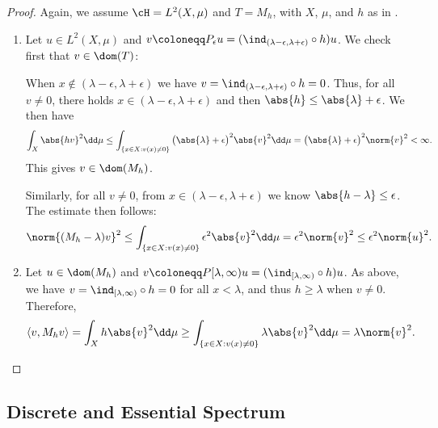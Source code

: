 \documentclass[oneside,reqno,letterpaper]{amsart}
\begin{document}
\begin{proof}
  Again, we assume \(\cH = L^2(X, \mu)\) and \(T = M_{h}\), with  \(X\), \(\mu\), and \(h\) as in . 
  \begin{enumerate}[label=(\alph*)]
  \item 
    Let \(u \in L^2(X, \mu)\) and \(v \coloneqq P_{\epsilon} u = (\ind_{(\lambda - \epsilon, \lambda + \epsilon)} \circ h) u\). 
    We check first that \(v \in \dom(T)\): 

    When \(x \not\in (\lambda - \epsilon, \lambda + \epsilon)\) we have \(v = \ind_{(\lambda - \epsilon, \lambda + \epsilon)} \circ h = 0\). 
    Thus, for all \(v \neq 0\), there holds \(x \in (\lambda - \epsilon, \lambda + \epsilon)\) and then \(\abs{h} \leq \abs{\lambda} + \epsilon\). 
    We then have 
    \[
      \int_{X} \abs{h v}^2 \dd\mu
      \leq \int_{\{x \in X: v(x) \neq 0\}} \big(\abs{\lambda} + \epsilon\big)^2 \abs{v}^2 \dd\mu 
      = \big(\abs{\lambda} + \epsilon\big)^2 \norm{v}^2 < \infty . 
    \] 
    This gives \(v \in \dom(M_{h})\). 

    Similarly, for all \(v \neq 0\), from \(x \in (\lambda - \epsilon, \lambda + \epsilon)\) we know \(\abs{h - \lambda} \leq \epsilon\).
    The estimate then follows:
    \[
      \norm{(M_{h} - \lambda) v}^2
      \leq \int_{\{x \in X: v(x) \neq 0\}} \epsilon^2 \abs{v}^2 \dd\mu  
      = \epsilon^2 \norm{v}^2  
      \leq \epsilon^2 \norm{u}^2 . 
    \] 
    
  \item 
    Let \(u \in \dom(M_{h})\) and \(v \coloneqq P[\lambda, \infty)u = (\ind_{[\lambda, \infty)} \circ h) u\). 
    As above, we have \(v = \ind_{[\lambda, \infty)} \circ h = 0\) for all \(x < \lambda\), and thus \(h \geq \lambda\) when \(v \neq 0\).
    Therefore, 
    \[
      \left< v, M_{h} v \right>
      = \int_{X} h \abs{v}^2 \dd\mu 
      \geq \int_{\{x \in X: v(x) \neq 0\}} \lambda \abs{v}^2 \dd\mu
      = \lambda \norm{v}^2 . 
    \] 
  \end{enumerate}
\end{proof}




\subsection{Discrete and Essential Spectrum}
\end{document}
